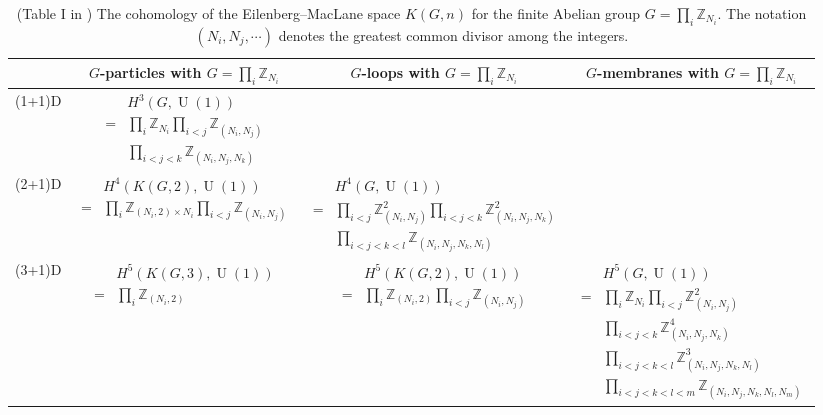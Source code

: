 \documentclass[reprint, amsmath, amssymb, showpacs, floatfix, longbibliography, aps, twocolumn, superscriptaddress, nofootinbib]{revtex4-2}
\theoremstyle{definition}
\begin{document}
\begin{table}[thb]
	\centering
	\renewcommand{\arraystretch}{1.5}
	\begin{tabular}{|c|c|c|c|}
		\hline
		& $G$-particles with $G= \prod_i \mathbb{Z}_{N_i}$ & $G$-loops with $G= \prod_i \mathbb{Z}_{N_i}$ & $G$-membranes with $G= \prod_i \mathbb{Z}_{N_i}$\\
		\hline
		(1+1)D & 
		$\begin{aligned}
			& H^3(G, \operatorname{U}(1)) \\
			=& \textstyle\prod_i \mathbb{Z}_{N_i} \textstyle\prod_{i<j} \mathbb{Z}_{(N_i, N_j)} \\
			&\textstyle\prod_{i<j<k} \mathbb{Z}_{(N_i, N_j, N_k)} 
		\end{aligned}$
		& &\\ 
		\hline
		(2+1)D & 
		$\begin{aligned}
			&H^4(K(G,2), \operatorname{U}(1)) \\
			=& \textstyle\prod_{i} \mathbb{Z}_{(N_i, 2) \times N_i} \textstyle\prod_{i<j} \mathbb{Z}_{(N_i, N_j)}
		\end{aligned}$
		& 
		$\begin{aligned}
			&H^4(G, \operatorname{U}(1)) \\
			=& \textstyle\prod_{i<j} \mathbb{Z}_{(N_i,N_j)}^2 \textstyle\prod_{i<j<k} \mathbb{Z}_{(N_i,N_j,N_k)}^2 \\
			&\textstyle\prod_{i<j<k<l} \mathbb{Z}_{(N_i,N_j,N_k,N_l)}
		\end{aligned}$
		&\\
		\hline
		(3+1)D & 
		$\begin{aligned}
			&H^5(K(G,3), \operatorname{U}(1)) \\
			=& \textstyle\prod_{i} \mathbb{Z}_{(N_i, 2)}
		\end{aligned}$
		& 
		$\begin{aligned}
			&H^5(K(G,2), \operatorname{U}(1)) \\
			=& \textstyle\prod_{i} \mathbb{Z}_{(N_i, 2)} \textstyle\prod_{i<j} \mathbb{Z}_{(N_i,N_j)}
		\end{aligned}$
		& 
		$\begin{aligned}
			&H^5(G, \operatorname{U}(1)) \\
			=& \textstyle\prod_{i} \mathbb{Z}_{N_i} \textstyle\prod_{i<j} \mathbb{Z}^2_{(N_i, N_j)} \\
			&\textstyle\prod_{i<j<k} \mathbb{Z}^4_{(N_i, N_j, N_k)}  \\
			&\textstyle\prod_{i<j<k<l} \mathbb{Z}^3_{(N_i,N_j,N_k,N_l)} \\
			&\textstyle\prod_{i<j<k<l<m} \mathbb{Z}_{(N_i,N_j,N_k,N_l,N_m)}
		\end{aligned}$ \\
		\hline
	\end{tabular}
	\caption{(Table I in \cite{Previous}) The cohomology of the Eilenberg–MacLane space $ K(G, n)$ for the finite Abelian group $G = \prod_i \mathbb{Z}_{N_i}$. The notation $(N_i, N_j, \cdots)$ denotes the greatest common divisor among the integers. 
	}
	\label{tab: particle loop membrane}
\end{table}
\end{document}
